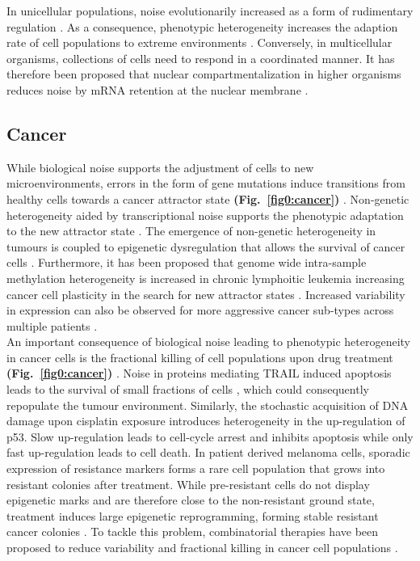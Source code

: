 In unicellular populations, noise evolutionarily increased as a form of rudimentary regulation \citep{Wolf2015}. As a consequence, phenotypic heterogeneity increases the adaption rate of cell populations to extreme environments \cite{Bodi2017}. Conversely, in multicellular organisms, collections of cells need to respond in a coordinated manner. It has therefore been proposed that nuclear compartmentalization in higher organisms reduces noise by mRNA retention at the nuclear membrane \citep{Battich2013, Stoeger2016}.

\subsection{Cancer}

While biological noise supports the adjustment of cells to new microenvironments, errors in the form of gene mutations induce transitions from healthy cells towards a cancer attractor state \textbf{(Fig.~\ref{fig0:cancer})} \citep{Marusyk2012}. Non-genetic heterogeneity aided by transcriptional noise supports the phenotypic adaptation to the new attractor state \citep{Jia2017}. The emergence of non-genetic heterogeneity in tumours is coupled to epigenetic dysregulation that allows the survival of cancer cells \citep{Timp2013}. Furthermore, it has been proposed that genome wide intra-sample methylation heterogeneity is increased in chronic lymphoitic leukemia increasing cancer cell plasticity in the search for new attractor states \citep{Landau2014}. Increased variability in expression can also be observed for more aggressive cancer sub-types across multiple patients \citep{Ecker2015}. \\

An important consequence of biological noise leading to phenotypic heterogeneity in cancer cells is the fractional killing of cell populations upon drug treatment \textbf{(Fig.~\ref{fig0:cancer})} \citep{Flusberg2015}. Noise in proteins mediating \Gls{TRAIL} induced apoptosis leads to the survival of small fractions of cells \citep{Spencer2009}, which could consequently repopulate the tumour environment. Similarly, the stochastic acquisition of DNA damage upon cisplatin exposure introduces heterogeneity in the up-regulation of p53. Slow up-regulation leads to cell-cycle arrest and inhibits apoptosis while only fast up-regulation leads to cell death. In patient derived melanoma cells, sporadic expression of resistance markers forms a rare cell population that grows into resistant colonies after treatment. While pre-resistant cells do not display epigenetic marks and are therefore close to the non-resistant ground state, treatment induces large epigenetic reprogramming, forming stable resistant cancer colonies \citep{Shaffer2017}. To tackle this problem, combinatorial therapies have been proposed to reduce variability and fractional killing in cancer cell populations \cite{Paek2016, Roux2015}.\\


